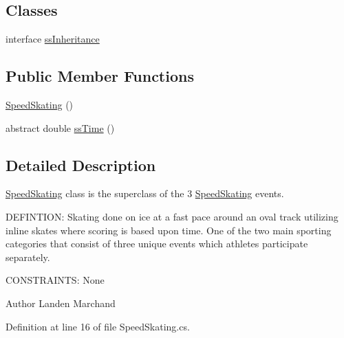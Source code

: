 \subsection*{Classes}
\begin{DoxyCompactItemize}
\item 
interface \hyperlink{interfacePCO_1_1SpeedSkating_1_1ssInheritance}{ss\+Inheritance}
\end{DoxyCompactItemize}
\subsection*{Public Member Functions}
\begin{DoxyCompactItemize}
\item 
\hyperlink{classPCO_1_1SpeedSkating_ae34dc14b71519b97d8eb3c59b6ec4dfe}{Speed\+Skating} ()
\item 
abstract double \hyperlink{classPCO_1_1SpeedSkating_a3bc4e4731f04b9ef3d260197ad847117}{ss\+Time} ()
\end{DoxyCompactItemize}


\subsection{Detailed Description}
\hyperlink{classPCO_1_1SpeedSkating}{Speed\+Skating} class is the superclass of the 3 \hyperlink{classPCO_1_1SpeedSkating}{Speed\+Skating} events. 

D\+E\+F\+I\+N\+T\+I\+O\+N\+: Skating done on ice at a fast pace around an oval track utilizing inline skates where scoring is based upon time. One of the two main sporting categories that consist of three unique events which athletes participate separately.

C\+O\+N\+S\+T\+R\+A\+I\+N\+T\+S\+: None\begin{DoxyAuthor}{Author}
Landen Marchand 
\end{DoxyAuthor}


Definition at line 16 of file Speed\+Skating.\+cs.



